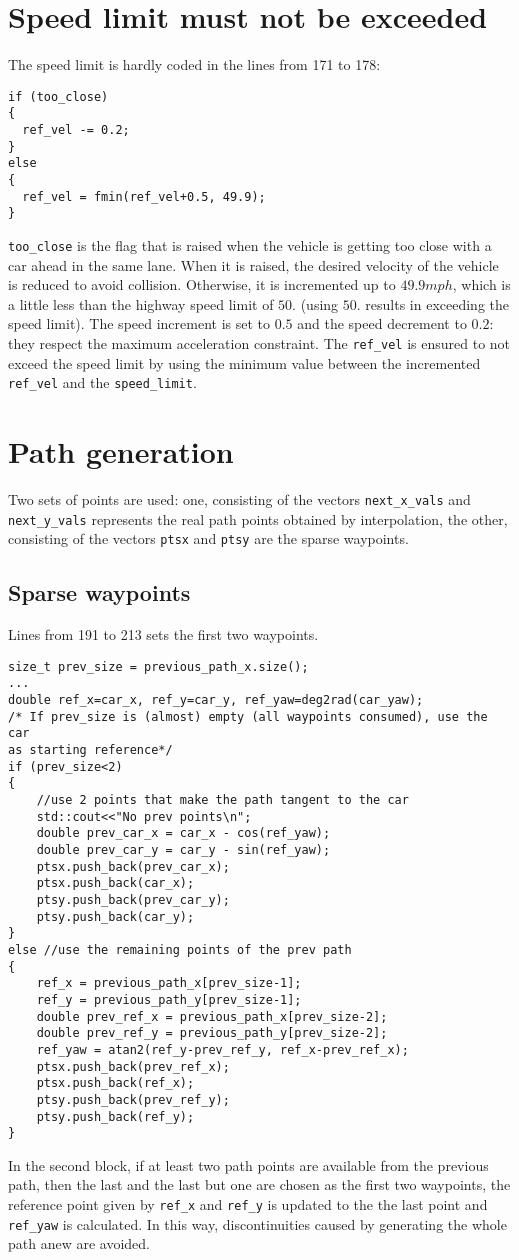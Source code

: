 \documentclass{article}
\let\cd\lstinline
\begin{document}
\section{Speed limit must not be exceeded}
The speed limit is hardly coded in the lines from 171 to 178:
\begin{lstlisting}
if (too_close)
{
  ref_vel -= 0.2;
}
else 
{
  ref_vel = fmin(ref_vel+0.5, 49.9);
}
\end{lstlisting}
\cd+too_close+ is the flag that is raised when the vehicle is getting too close with a car ahead in the same lane. When it is raised, the desired velocity of the vehicle is reduced to avoid collision. Otherwise, it is incremented up to $49.9mph$, which is a little less than the highway speed limit of $50.$ (using $50.$ results in exceeding the speed limit). The  speed increment is set to $0.5$ and the speed decrement to $0.2$: they respect the maximum acceleration constraint. The \cd+ref_vel+ is ensured to not exceed the speed limit by using the minimum value between the incremented \cd+ref_vel+ and the \cd+speed_limit+.

\section{Path generation}
Two sets of points are used: one, consisting of the vectors \cd+next_x_vals+ and \cd+next_y_vals+ represents the real path points obtained by interpolation, the other, consisting of the vectors \cd+ptsx+ and \cd+ptsy+ are the sparse waypoints.

\subsection{Sparse waypoints}
Lines from 191 to 213 sets the first two waypoints. 
\begin{lstlisting}
size_t prev_size = previous_path_x.size();
...
double ref_x=car_x, ref_y=car_y, ref_yaw=deg2rad(car_yaw);
/* If prev_size is (almost) empty (all waypoints consumed), use the car
as starting reference*/
if (prev_size<2)
{
    //use 2 points that make the path tangent to the car
    std::cout<<"No prev points\n";
    double prev_car_x = car_x - cos(ref_yaw);
    double prev_car_y = car_y - sin(ref_yaw);
    ptsx.push_back(prev_car_x);
    ptsx.push_back(car_x);
    ptsy.push_back(prev_car_y);
    ptsy.push_back(car_y);
}
else //use the remaining points of the prev path
{
    ref_x = previous_path_x[prev_size-1];
    ref_y = previous_path_y[prev_size-1];
    double prev_ref_x = previous_path_x[prev_size-2];
    double prev_ref_y = previous_path_y[prev_size-2];
    ref_yaw = atan2(ref_y-prev_ref_y, ref_x-prev_ref_x);
    ptsx.push_back(prev_ref_x);
    ptsx.push_back(ref_x);
    ptsy.push_back(prev_ref_y);
    ptsy.push_back(ref_y);
}
\end{lstlisting}
In the second block, if at least two path points are available from the previous path, then the last and the last but one are chosen as the first two waypoints, the reference point given by \cd+ref_x+ and \cd+ref_y+ is updated to the the last point and \cd+ref_yaw+ is calculated. In this way, discontinuities caused by generating the whole path anew are avoided.
\end{document}
